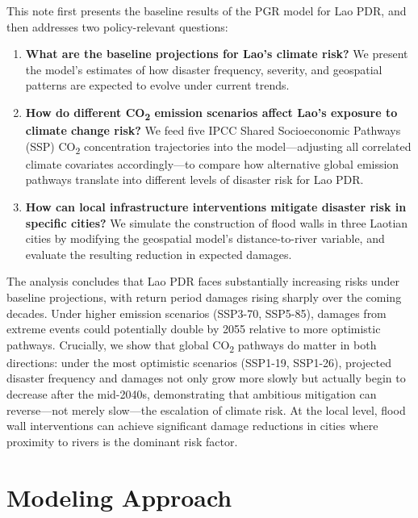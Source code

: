 \documentclass[11pt,a4paper]{article}
\begin{document}
This note first presents the baseline results of the PGR model for Lao PDR, and then addresses two policy-relevant questions:

\begin{enumerate}[leftmargin=2em]
  \item \textbf{What are the baseline projections for Lao's climate risk?} We present the model's estimates of how disaster frequency, severity, and geospatial patterns are expected to evolve under current trends.

  \item \textbf{How do different CO\textsubscript{2} emission scenarios affect Lao's exposure to climate change risk?} We feed five IPCC Shared Socioeconomic Pathways (SSP) CO\textsubscript{2} concentration trajectories into the model---adjusting all correlated climate covariates accordingly---to compare how alternative global emission pathways translate into different levels of disaster risk for Lao PDR.

  \item \textbf{How can local infrastructure interventions mitigate disaster risk in specific cities?} We simulate the construction of flood walls in three Laotian cities by modifying the geospatial model's distance-to-river variable, and evaluate the resulting reduction in expected damages.
\end{enumerate}

The analysis concludes that Lao PDR faces substantially increasing risks under baseline projections, with return period damages rising sharply over the coming decades. Under higher emission scenarios (SSP3-70, SSP5-85), damages from extreme events could potentially double by 2055 relative to more optimistic pathways. Crucially, we show that global CO\textsubscript{2} pathways do matter in both directions: under the most optimistic scenarios (SSP1-19, SSP1-26), projected disaster frequency and damages not only grow more slowly but actually begin to decrease after the mid-2040s, demonstrating that ambitious mitigation can reverse---not merely slow---the escalation of climate risk. At the local level, flood wall interventions can achieve significant damage reductions in cities where proximity to rivers is the dominant risk factor.

\section{Modeling Approach}
\end{document}
